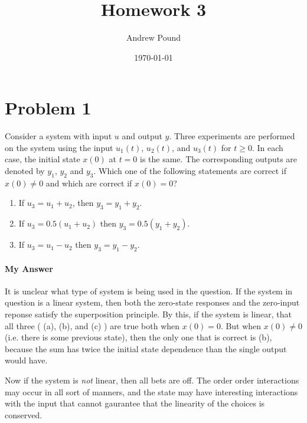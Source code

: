 \documentclass[10pt]{article}
\title{Homework 3
}
\author{Andrew Pound}
\date{\today}
\begin{document}
\maketitle


\section{Problem 1}

Consider a system with input $u$ and output $y$. Three experiments are
performed on the system using the input $u_1(t)$, $u_2(t)$, and
$u_3(t)$ for $t \ge 0$. In each case, the initial state $x(0)$ at $t =
0$ is the same. The corresponding outputs are denoted by $y_1$, $y_2$
and $y_3$. Which one of the following statements are correct if $x(0)
\neq 0$ and which are correct if $x(0) = 0$?
\begin{enumerate}
\item If $u_3 = u_1 + u_2$, then $y_3 = y_1 + y_2$.

\item If $u_3 = 0.5(u_1 + u_2)$ then $y_3 = 0.5(y_1 + y_2)$.
\item If $u_3 = u_1- u_2$ then $y_3 = y_1 - y_2$.
\end{enumerate}
\paragraph{My Answer}
It is unclear what type of system is being used in the question.  
If the system in question is a linear system, then both the zero-state
responses and the zero-input reponse satisfy the superposition
principle.  By this, if the system is linear, that all three ( (a),
(b), and  (c) ) are true both when  $x(0) = 0$. 
But when $x(0) \neq 0$ (i.e. there is some previous state), then the
only one that is correct is (b), because the sum  has twice the
initial state dependence than the single output would have.



Now if the system is \emph{not} linear, then all bets are off.  The
order order interactions may occur in all sort of manners, and the
state may have interesting interactions with the input that cannot
gaurantee that the linearity of the choices is conserved.
\end{document}
